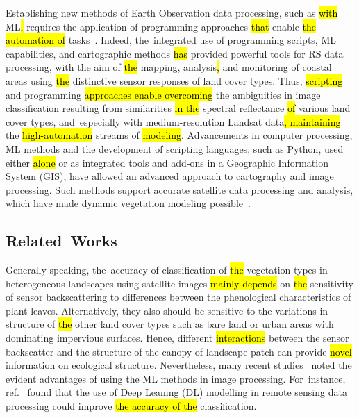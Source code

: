 \documentclass[coasts,article,accept,pdftex,oneauthor]{Definitions/mdpi}
\begin{document}
Establishing new methods of Earth Observation data processing, such as \hl{with} ML\hl{,} requires the application of programming approaches \hl{that} enable \hl{the automation of} tasks~\cite{MULLISSA2023113799,Lemenkova202206}. Indeed, the~integrated use of\hl{ }programming scripts, ML capabilities, and cartographic methods \hl{has} provided powerful tools for RS data processing, with the aim of \hl{the} mapping, analysis\hl{,} and monitoring of coastal areas using \hl{the} distinctive sensor responses of land cover types. {Thus, \hl{scripting} and programming \hl{approaches enable overcoming} the ambiguities in image classification resulting from similarities \hl{in the} spectral reflectance \hl{of} various land cover types, and~especially with\hl{ }medium-resolution Landsat data\hl{, maintaining} the \hl{high-automation} streams of \hl{modeling}.} Advancements in computer processing, ML methods and the development of scripting languages, such as Python, used either \hl{alone} or {as }integrated {tools and add-ons }in a Geographic Information System (GIS), have allowed an advanced {approach to} cartography and image processing. Such methods support accurate satellite data processing and analysis, which have {made} dynamic vegetation modeling possible~\cite{Lemenkova202227}. 

\subsection{Related~Works}
Generally speaking, the~accuracy of classification of \hl{the} vegetation types in heterogeneous landscapes using satellite images \hl{mainly depends} on \hl{the} sensitivity of sensor backscattering to\hl{ }{differences} between the phenological characteristics of plant leaves{. Alternatively, they also should be sensitive to the variations in} structure of \hl{the} other land cover types{ }such as bare land or urban areas with dominating impervious surfaces{. Hence, }different \hl{interactions} between the sensor backscatter and the structure of the canopy of landscape patch {can provide \hl{novel} information on ecological structure}. Nevertheless, many recent studies~\cite{rs15235559,WU2023103407,CHEN2023101499,rs15225387,LIN2021102370}\hl{ }noted the evident advantages of using the {ML} methods in image processing. For~instance, ref.~\cite{LIAO2023110231} found that the use of Deep Leaning (DL) modelling in remote sensing data processing could improve \hl{the accuracy of the }classification. 
\end{document}
